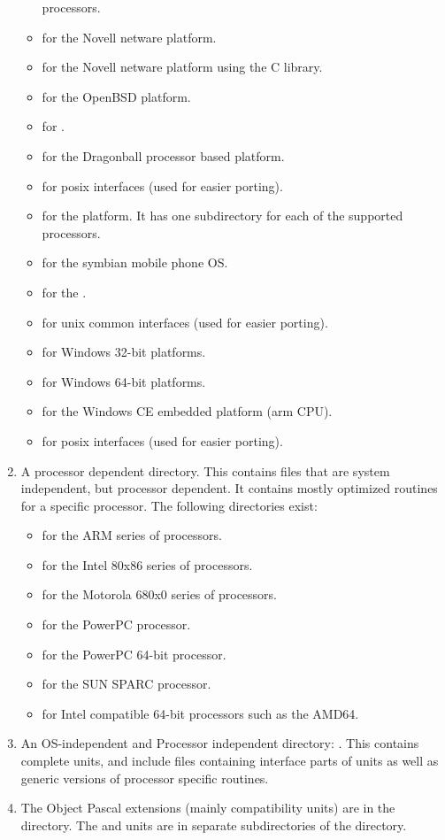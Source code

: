 \begin{enumerate}
\begin{itemize}
processors.
\item {} for the Novell netware platform.
\item {} for the Novell netware platform using the C library.
\item {} for the OpenBSD platform.
\item {} for \ostwo.
\item {} for the \palmos Dragonball processor based platform.
\item {} for posix interfaces (used for easier porting).
\item {} for the \solaris platform. It has one subdirectory for each of the supported
processors.
\item {} for the symbian mobile phone OS.
\item {} for the \qnx.
\item {} for unix common interfaces (used for easier porting).
\item {} for Windows 32-bit platforms.
\item {} for Windows 64-bit platforms.
\item {} for the Windows CE embedded platform (arm CPU).
\item {} for posix interfaces (used for easier porting).
\end{itemize}
\item A processor dependent directory. This contains files that are system
independent, but processor dependent. It contains mostly optimized routines
for a specific processor. The following directories exist:
\begin{itemize}
\item {} for the ARM series of processors.
\item {} for the Intel 80x86 series of processors.
\item {} for the Motorola 680x0 series of processors.
\item {} for the PowerPC processor.
\item {} for the PowerPC 64-bit processor.
\item {} for the SUN SPARC processor.
\item {} for Intel compatible 64-bit processors such as the AMD64.
\end{itemize}
\item An OS-independent and Processor independent directory: . This
contains complete units, and include files containing interface parts of
units as well as generic versions of processor specific routines.
\item The Object Pascal extensions (mainly \delphi compatibility units) are
in the  directory. The  and  units
are in separate subdirectories of the  directory.
\end{enumerate}

